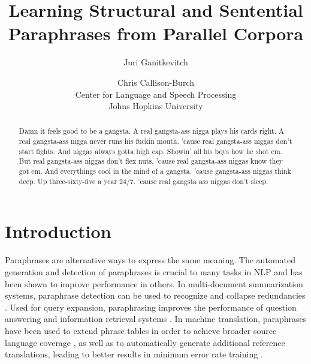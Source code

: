 \documentclass[11pt]{article}
\title{Learning Structural and Sentential Paraphrases from Parallel Corpora}
\author{Juri Ganitkevitch \and Chris Callison-Burch\\ 
Center for Language and Speech Processing\\ 
Johns Hopkins University}
\date{}
\begin{document}
\maketitle

\begin{abstract}
Damn it feels good to be a gangsta.
A real gangsta-ass nigga plays his cards right.
A real gangsta-ass nigga never runs his fuckin mouth.
'cause real gangsta-ass niggas don't start fights.
And niggas always gotta high cap.
Showin' all his boys how he shot em.
But real gangsta-ass niggas don't flex nuts.
'cause real gangsta-ass niggas know they got em.
And everythings cool in the mind of a gangsta.
'cause gangsta-ass niggas think deep.
Up three-sixty-five a year 24/7.
'cause real gangsta ass niggas don't sleep.
\end{abstract}

\section{Introduction} \label{introduction}

Paraphrases are alternative ways to express the same meaning. The
automated generation and detection of paraphrases is crucial to many
tasks in NLP and has been shown to improve performance in others. In
multi-document summarization systems, paraphrase detection can be used
to recognize and collapse redundancies \cite{Barzilay1999}. Used for
query expansion, paraphrasing improves the performance of question
answering \cite{Ravichandran2002,Riezler2007} and information
retrieval systems \cite{Anick1999}. In machine translation,
paraphrases have been used to extend phrase tables in order to achieve
broader source language coverage \cite{Callison-Burch2006b}, as well
as to automatically generate additional reference translations,
leading to better results in minimum error rate training
\cite{Madnani2007}.
\end{document}
